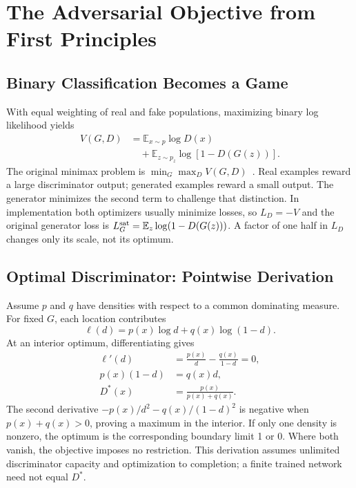 \documentclass[conference]{IEEEtran}
\newcommand{\E}{\mathbb{E}}
\begin{document}
\section{The Adversarial Objective from First Principles}
\subsection{Binary Classification Becomes a Game}
With equal weighting of real and fake populations, maximizing binary log likelihood yields
\begin{align}
V(G,D)&=\E_{x\sim p}\log D(x)\nonumber\\
&\quad+\E_{z\sim p_z}\log[1-D(G(z))].\label{eq:value}
\end{align}
The original minimax problem is $\min_G\max_D V(G,D)$~\cite{gan}. Real examples reward a large discriminator output; generated examples reward a small output. The generator minimizes the second term to challenge that distinction. In implementation both optimizers usually minimize losses, so $L_D=-V$ and the original generator loss is $L_G^{\rm sat}=\E_z\log(1-D(G(z)))$. A factor of one half in $L_D$ changes only its scale, not its optimum.

\subsection{Optimal Discriminator: Pointwise Derivation}
Assume $p$ and $q$ have densities with respect to a common dominating measure. For fixed $G$, each location contributes
\begin{equation}
\ell(d)=p(x)\log d+q(x)\log(1-d).
\end{equation}
At an interior optimum, differentiating gives
\begin{align}
\ell'(d)&=\frac{p(x)}d-\frac{q(x)}{1-d}=0,\\
p(x)(1-d)&=q(x)d,\\
D^*(x)&=\frac{p(x)}{p(x)+q(x)}.\label{eq:dstar}
\end{align}
The second derivative $-p(x)/d^2-q(x)/(1-d)^2$ is negative when $p(x)+q(x)>0$, proving a maximum in the interior. If only one density is nonzero, the optimum is the corresponding boundary limit 1 or 0. Where both vanish, the objective imposes no restriction. This derivation assumes unlimited discriminator capacity and optimization to completion; a finite trained network need not equal $D^*$.
\end{document}
